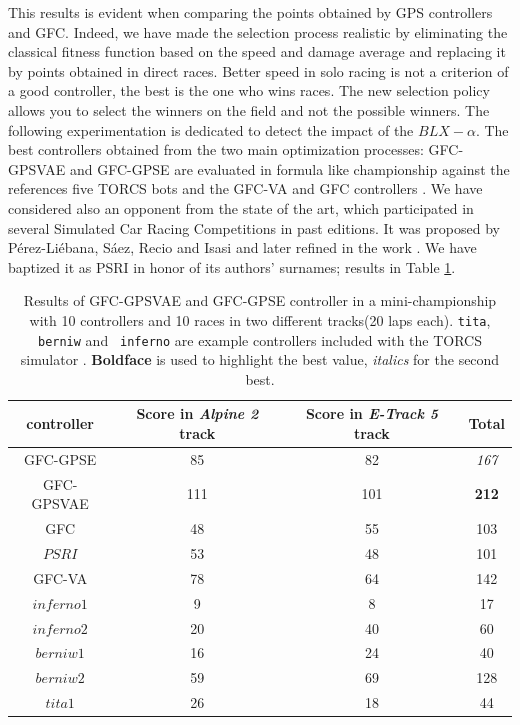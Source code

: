\documentclass[10pt,journal,compsoc]{IEEEtran}
\begin{document}
This results is evident when comparing the points obtained by GPS controllers and GFC.
Indeed, we have made the selection process  realistic by eliminating
the classical fitness function based on the speed and damage average
and replacing it by points obtained in direct races. 
Better speed in solo racing is not a criterion of a good controller, the
best is the one who wins races. The new selection policy allows you to
select the winners on the field and not the possible winners. 
The following experimentation is dedicated to detect the impact of the $BLX-\alpha$.
The best controllers obtained from the two main optimization
processes: {\sf GFC-GPSVAE} and {\sf GFC-GPSE} are evaluated in formula like
championship against the references five TORCS bots and the {\sf GFC-VA}\cite{DBLP:conf/cig/SalemMG19}
and {\sf GFC} controllers  \cite{salem_cig2018}. We have considered also an opponent from the
state of the art, which participated in several Simulated Car Racing
Competitions in past editions.  %
It was proposed by P{\'e}rez-Li{\'e}bana, S{\'a}ez, Recio and Isasi
\cite{EvolvingRuleSystem08} and later refined in the work
\cite{PerezEvolvingFuzzy09}. We have baptized it as PSRI in honor of
its authors' surnames; results in Table \ref{tab:allsresults}.
%
\begin{table}[ht]
	\centering
	{\scriptsize
		\caption{ Results of {\sf GFC-GPSVAE} and {\sf GFC-GPSE}
                  controller in a mini-championship with 10 controllers
                  and 10 %
			races in two different tracks(20 laps each). {\tt tita}, {\tt berniw} and {\tt
				inferno} are example controllers included with the TORCS
			simulator \cite{torcs4}.  {\bf Boldface} is
                        used to highlight the best value, {\em italics} for the second
                    best.}
		{
			\begin{tabular}{|c|c|c||c|}
				\hline
				controller&Score in \textit{Alpine 2} track &Score in \textit{E-Track 5} track &Total\\
				\hline
				\hline
{\sf GFC-GPSE}&	85&	82&	{\em 167}\\
{\sf GFC-GPSVAE}&111&101&            {\bf 212}\\
{\sf GFC}  \cite{salem_cig2018}&		48&	55&	103\\
$PSRI$\cite{PerezEvolvingFuzzy09}&		53&	48&	101\\
{\sf GFC-VA} \cite{DBLP:conf/cig/SalemMG19}&	78&	64&	142\\
$inferno1$&	9&	8&	17\\
$inferno2$&	20&	40&	60\\
$berniw1$&	16&	24&	40\\
$berniw2$&	59&	69&	128\\
$tita1$&	26&	18&	44\\
					\hline
				
			\end{tabular}
		}\label{tab:allsresults}
	}
\end{table}
%
\end{document}
